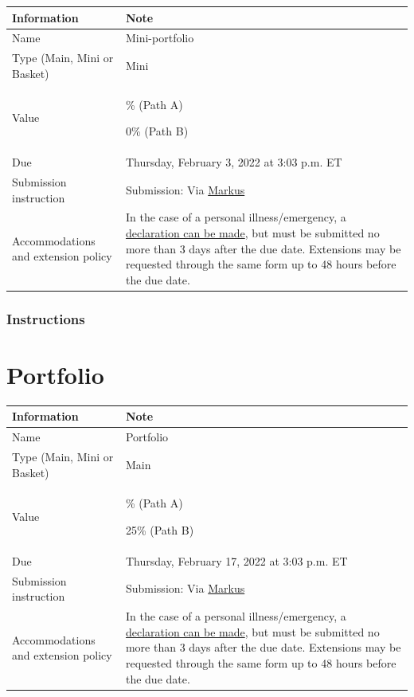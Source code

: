 \documentclass[
  openany]{book}
\begin{document}
\begin{longtable}[]{@{}
  >{\raggedright\arraybackslash}p{}
  >{\raggedright\arraybackslash}p{}@{}}
\toprule
\textbf{Information} & \textbf{Note} \\
\midrule
\endhead
Name & Mini-portfolio \\
Type (Main, Mini or Basket) & Mini \\
Value & 5\% (Path A)

0\% (Path B) \\
Due & Thursday, February 3, 2022 at 3:03 p.m. ET \\
Submission instruction & Submission: Via \href{https://markus-ds.teach.cs.toronto.edu/}{Markus} \\
Accommodations and extension policy & In the case of a personal illness/emergency, a \href{https://forms.office.com/Pages/ResponsePage.aspx?id=JsKqeAMvTUuQN7RtVsVSEOKHUU3SzAJJhmOKjJhDWEpUNTFDSzhZTFlXUzVYMVlNM1FEUTRZMkVWOC4u}{declaration can be made}, but must be submitted no more than 3 days after the due date. Extensions may be requested through the same form up to 48 hours before the due date. \\
\bottomrule
\end{longtable}

\hypertarget{instructions}{%
\subsection{Instructions}\label{instructions}}

\hypertarget{portfolio}{%
\chapter{Portfolio}\label{portfolio}}

\begin{longtable}[]{@{}
  >{\raggedright\arraybackslash}p{}
  >{\raggedright\arraybackslash}p{}@{}}
\toprule
\textbf{Information} & \textbf{Note} \\
\midrule
\endhead
Name & Portfolio \\
Type (Main, Mini or Basket) & Main \\
Value & 20\% (Path A)

25\% (Path B) \\
Due & Thursday, February 17, 2022 at 3:03 p.m. ET \\
Submission instruction & Submission: Via \href{https://markus-ds.teach.cs.toronto.edu/}{Markus} \\
Accommodations and extension policy & In the case of a personal illness/emergency, a \href{https://forms.office.com/Pages/ResponsePage.aspx?id=JsKqeAMvTUuQN7RtVsVSEOKHUU3SzAJJhmOKjJhDWEpUNTFDSzhZTFlXUzVYMVlNM1FEUTRZMkVWOC4u}{declaration can be made}, but must be submitted no more than 3 days after the due date. Extensions may be requested through the same form up to 48 hours before the due date. \\
\bottomrule
\end{longtable}
\end{document}
